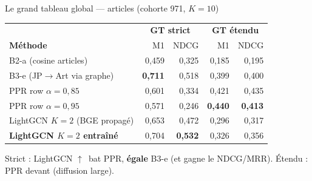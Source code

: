 \documentclass[aspectratio=169,10pt]{beamer}
\newcommand{\keybox}[1]{\begin{center}\colorbox{accentsoft}{\parbox{0.92\linewidth}{\centering #1}}\end{center}}
\newcommand{\win}{\textbf{\textcolor{ok}{$\uparrow$}}}
\begin{document}
\begin{frame}{Le grand tableau global — articles (cohorte 971, $K{=}10$)}
  \scriptsize
  \renewcommand{\arraystretch}{1.15}
  \setlength{\tabcolsep}{5pt}
  \begin{center}
  \begin{tabular}{@{}l r r | r r@{}}
    \toprule
    & \multicolumn{2}{c|}{\textbf{GT strict}} & \multicolumn{2}{c}{\textbf{GT étendu}} \\
    \textbf{Méthode} & M1 & NDCG & M1 & NDCG \\
    \midrule
    B2-a (cosine articles)            & 0,459 & 0,325 & 0,185 & 0,195 \\
    B3-e (JP$\to$Art via graphe)      & \textbf{0,711} & 0,518 & 0,399 & 0,400 \\
    PPR row $\alpha{=}0{,}85$         & 0,601 & 0,334 & 0,421 & 0,435 \\
    PPR row $\alpha{=}0{,}95$         & 0,571 & 0,246 & \textbf{0,440} & \textbf{0,413} \\
    \rowcolor{accentsoft} LightGCN $K{=}2$ (BGE propagé) & 0,653 & 0,472 & 0,296 & 0,317 \\
    \rowcolor{accentsoft} \textbf{LightGCN $K{=}2$ entraîné} & 0,704 & \textbf{0,532} & 0,326 & 0,356 \\
    \bottomrule
  \end{tabular}
  \end{center}
  \keybox{Strict : LightGCN \win~bat PPR, \textbf{égale} B3-e (et gagne le NDCG/MRR). \quad
  Étendu : PPR devant (diffusion large).}
\end{frame}
\end{document}
